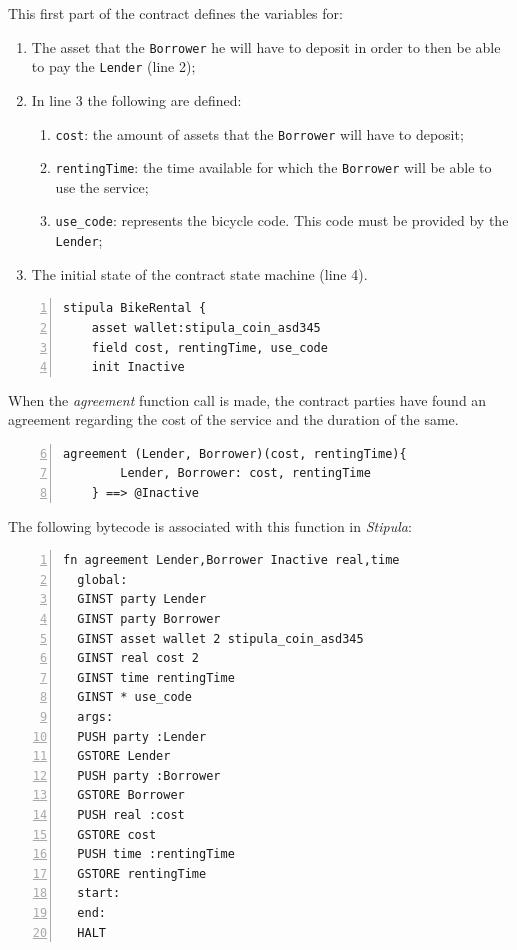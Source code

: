 This first part of the contract defines the variables for:
\begin{enumerate}
  \item The asset that the \verb|Borrower| he will have to deposit in order to then be able to pay the 
  \verb|Lender| (line 2);
  \item In line 3 the following are defined:
  \begin{enumerate}
    \item \verb|cost|: the amount of assets that the \verb|Borrower| will have to deposit;
    \item \verb|rentingTime|: the time available for which the \verb|Borrower| will be able to use the 
    service;
    \item \verb|use_code|: represents the bicycle code. This code must be provided by the \verb|Lender|;
  \end{enumerate}
  \item The initial state of the contract state machine (line 4).
\end{enumerate}

\begin{Verbatim}[numbers=left,xleftmargin=1cm,firstnumber=1,tabsize=2]
  stipula BikeRental {
    asset wallet:stipula_coin_asd345
    field cost, rentingTime, use_code
    init Inactive
\end{Verbatim}

When the \textit{agreement} function call is made, the contract parties have found an agreement regarding 
the cost of the service and the duration of the same.

\begin{Verbatim}[numbers=left,xleftmargin=1cm,firstnumber=6,tabsize=2]
  agreement (Lender, Borrower)(cost, rentingTime){
        Lender, Borrower: cost, rentingTime
    } ==> @Inactive
\end{Verbatim}

The following bytecode is associated with this function in \textit{Stipula}:

\begin{Verbatim}[numbers=left,xleftmargin=1cm,firstnumber=1,tabsize=2]
  fn agreement Lender,Borrower Inactive real,time
  global:
  GINST party Lender
  GINST party Borrower
  GINST asset wallet 2 stipula_coin_asd345
  GINST real cost 2
  GINST time rentingTime
  GINST * use_code
  args:
  PUSH party :Lender
  GSTORE Lender
  PUSH party :Borrower
  GSTORE Borrower
  PUSH real :cost
  GSTORE cost
  PUSH time :rentingTime
  GSTORE rentingTime
  start:
  end:
  HALT
\end{Verbatim}

